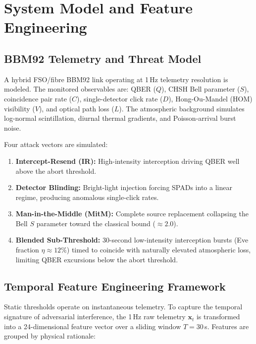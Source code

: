 \documentclass[conference]{IEEEtran}
\begin{document}
\section{System Model and Feature Engineering}

\subsection{BBM92 Telemetry and Threat Model}

A hybrid FSO/fibre BBM92 link operating at 1\,Hz telemetry resolution is modeled. The monitored observables are: QBER ($Q$), CHSH Bell parameter ($S$), coincidence pair rate ($C$), single-detector click rate ($D$), Hong-Ou-Mandel (HOM) visibility ($V$), and optical path loss ($L$). The atmospheric background simulates log-normal scintillation, diurnal thermal gradients, and Poisson-arrival burst noise.

Four attack vectors are simulated:
\begin{enumerate}
    \item \textbf{Intercept-Resend (IR):} High-intensity interception driving QBER well above the abort threshold.
    \item \textbf{Detector Blinding:} Bright-light injection forcing SPADs into a linear regime, producing anomalous single-click rates.
    \item \textbf{Man-in-the-Middle (MitM):} Complete source replacement collapsing the Bell $S$ parameter toward the classical bound ($\approx 2.0$).
    \item \textbf{Blended Sub-Threshold:} 30-second low-intensity interception bursts (Eve fraction $\eta \approx 12\%$) timed to coincide with naturally elevated atmospheric loss, limiting QBER excursions below the abort threshold.
\end{enumerate}

\subsection{Temporal Feature Engineering Framework}

Static thresholds operate on instantaneous telemetry. To capture the temporal signature of adversarial interference, the 1\,Hz raw telemetry $\mathbf{x}_t$ is transformed into a 24-dimensional feature vector over a sliding window $T = 30$\,s. Features are grouped by physical rationale:
\end{document}
